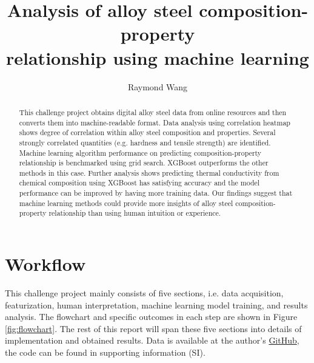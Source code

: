 \documentclass[10pt,aps,prb,amsmath,amssymb,twocolumn,letterpaper,nobalancelastpage,final,citeautoscript,floatfix,raggedbottom,superscriptaddress]{revtex4-1}
\begin{document}
\title{Analysis of alloy steel composition-property \\ relationship using machine learning}

\author{Raymond Wang}

  

\begin{abstract}
This challenge project obtains digital alloy steel data from online resources and then converts them into machine-readable format. Data analysis using correlation heatmap shows degree of correlation within alloy steel composition and properties. Several strongly correlated quantities (e.g. hardness and tensile strength) are identified. Machine learning algorithm performance on predicting composition-property relationship is benchmarked using grid search. XGBoost outperforms the other methods in this case. Further analysis shows predicting thermal conductivity from chemical composition using XGBoost has satisfying accuracy and the model performance can be improved by having more training data. Our findings suggest that machine learning methods could provide more insights of alloy steel composition-property relationship than using human intuition or experience.
\end{abstract}

\maketitle


\section{Workflow}

This challenge project mainly consists of five sections, i.e. data acquisition, featurization, human interpretation, machine learning model training, and results analysis. The flowchart and specific outcomes in each step are shown in Figure \ref{fig:flowchart}. The rest of this report will span these five sections into details of implementation and obtained results. Data is available at the author's \href{https://github.com/raymond931118/scraping}{GitHub}, the code can be found in supporting information (SI).
\end{document}
